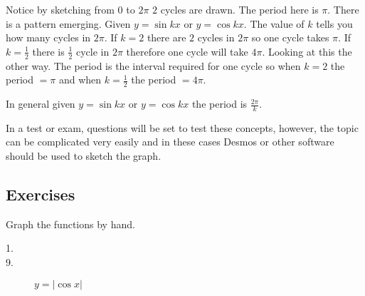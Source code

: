 \setlength\fboxrule{0.01in}\setlength\fboxsep{0.2in}


Notice by sketching from $0$ to $2 \pi $ $2$ cycles are drawn. The period here is $\pi $. There is a pattern emerging. Given
$y =\sin  k x$ or $y =\cos  k x$. The value of $k$ tells you how many cycles in $2 \pi $. If $k =2$ there are $2$ cycles in $2 \pi $ so one cycle takes $\pi $. If $k =\frac{1}{2}$ there is $\frac{1}{2}$ cycle in $2 \pi $ therefore one cycle will take $4 \pi $. Looking at this the other way. The
period is the interval required for one cycle so when $k =2$ the period $ =\pi $ and when $k =\frac{1}{2}$ the period $ =4 \pi \text{.}$ 

In general given $y =\sin  k x$ or $y =\cos  k x$ the period is $\frac{2 \pi }{k}$. 

In a test or exam, questions will be set to test these concepts, however, the topic can be complicated very
easily and in these cases Desmos or other software should be used to sketch the graph. 

\subsection{Exercises}
Graph the functions by hand. 

\begin{description}
	\item [1.]   
	\columnsep =30pt
	\begin {multicols}{2}
	$y =1 +\sin  x$ 
	
	\item [3.] $y =1 -\cos  x$ 
	\end {multicols}
	
	\columnsep =30pt
	\begin {multicols}{2}
	\item [5.]
	
	$y = -2 \sin  x$ 
	
	\item [7.] $y =4 -2 \cos  x$ 
	\end {multicols}
	
	
	\item [9.]
	$y =\left \vert \cos  x\right \vert $ \end{description}

